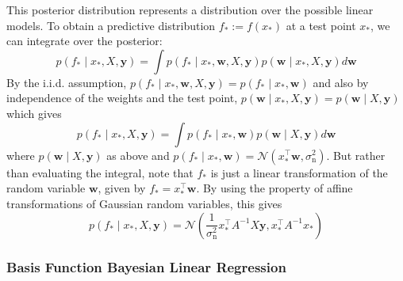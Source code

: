 \documentclass[11pt]{report} %
\begin{document}
This posterior distribution represents a distribution over the possible linear models. To obtain a predictive distribution $f_{*} := f\left(x_{*}\right)$ at a test point $x_{*}$, we can integrate over the posterior:
\begin{equation}
p\left(f_{*}\middle|x_{*},X,\mathbf{y}\right)=\int p\left(f_{*}\middle|x_{*},\mathbf{w},X,\mathbf{y}\right)p\left(\mathbf{w}\middle|x_{*},X,\mathbf{y}\right)d\mathbf{w}
\end{equation}
By the i.i.d. assumption, $p\left(f_{*}\middle|x_{*},\mathbf{w},X,\mathbf{y}\right) = p\left(f_{*}\middle|x_{*},\mathbf{w}\right)$ and also by independence of the weights and the test point, $p\left(\mathbf{w}\middle|x_{*},X,\mathbf{y}\right) = p\left(\mathbf{w}\middle|X,\mathbf{y}\right)$ which gives
\begin{equation}
p\left(f_{*}\middle|x_{*},X,\mathbf{y}\right)= \int p\left(f_{*}\middle|x_{*},\mathbf{w}\right)p\left(\mathbf{w}\middle|X,\mathbf{y}\right)d\mathbf{w}
\end{equation}
where $p\left(\mathbf{w}\middle|X,\mathbf{y}\right)$ as above and $p\left(f_{*}\middle|x_{*},\mathbf{w}\right) = \mathcal{N}\left(x_{*}^{\top}\mathbf{w}, \sigma_{\mathrm{n}}^{2}\right)$. But rather than evaluating the integral, note that $f_{*}$ is just a linear transformation of the random variable $\mathbf{w}$, given by $f_{*}=x_{*}^{\top}\mathbf{w}$. By using the property of affine transformations of Gaussian random variables, this gives
\begin{equation}
p\left(f_{*}\middle|x_{*},X,\mathbf{y}\right)=\mathcal{N}\left(\dfrac{1}{\sigma_{\mathrm{n}}^{2}}x_{*}^{\top}A^{-1}X\mathbf{y},x_{*}^{\top}A^{-1}x_{*}\right)
\end{equation}

\subsubsection{Basis Function Bayesian Linear Regression}
\end{document}
